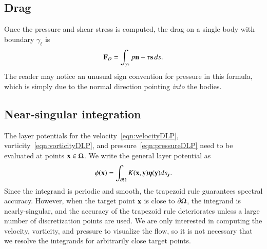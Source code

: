 \documentclass[preprint, 10pt]{elsarticle}
\begin{document}
\subsection{Drag}
\label{sec:drag}
Once the pressure and shear stress is computed, the drag on a single
body with boundary $\gamma_\ell$ is
\begin{align}
\mathbf{F}_{D} = \int_{\gamma_\ell} p {\mathbf{n}} + \tau {\mathbf{s}} \,ds.
\label{eqn:drag}
\end{align}
The reader may notice an unusual sign convention for pressure in this formula, which is simply due to the normal direction pointing {\em into} the bodies.

\subsection{Near-singular integration}
\label{sec:NSI}
The layer potentials for the velocity~\eqref{eqn:velocityDLP},
vorticity~\eqref{eqn:vorticityDLP}, and pressure~\eqref{eqn:pressureDLP}
need to be evaluated at points ${\mathbf{x}} \in \Omega$. We write the general
layer potential as
\begin{align}
  \phi({\mathbf{x}}) = \int_{{\partial}\Omega} K({\mathbf{x}},{\mathbf{y}}) {\boldsymbol\eta}({\mathbf{y}}) ds_{\mathbf{y}}.
  \label{eqn:genericLP}
\end{align}
Since the integrand is periodic and smooth, the trapezoid rule
guarantees spectral accuracy.  However, when the target point ${\mathbf{x}}$ is
close to ${\partial}\Omega$, the integrand is nearly-singular, and the accuracy
of the trapezoid rule deteriorates unless a large number of
discretization points are used.  We are only interested in computing the
velocity, vorticity, and pressure to visualize the flow, so it is not
necessary that we resolve the integrands for arbitrarily close target
points.
\end{document}
